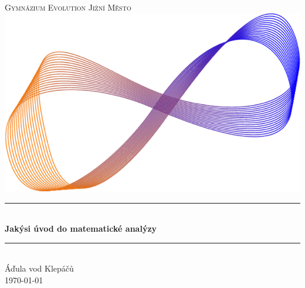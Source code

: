 \begin{titlepage}
 \newcommand{\HRule}{\rule{\linewidth}{0.5mm}}
 \center
 \textsc{\LARGE
  Gymnázium Evolution Jižní Město
 } \\[1cm]
 \includegraphics[width=.5\textwidth]{moebius.png} \\[1cm]
 \HRule \\[0.4cm]
 { \huge \sffamily \bfseries Jakýsi úvod do matematické analýzy \\[0.4cm] }
 \HRule \\[1.5cm]
 \large Áďula vod Klepáčů
 \\[1cm]
 \large \today \\ [1cm]
\end{titlepage}
